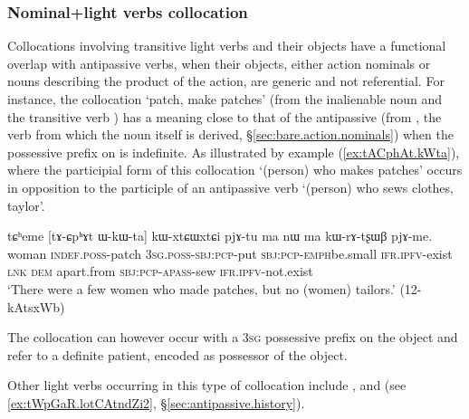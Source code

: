 \subsubsection{Nominal+light verbs collocation  } \label{sec:antipassive.vs.light.verbs}
Collocations involving transitive light verbs and their objects have a functional overlap with antipassive verbs, when their objects, either action nominals or nouns describing the product of the action, are generic and not referential. For instance, the collocation  `patch, make patches' (from the inalienable noun  and the transitive verb ) has a meaning close to that of the antipassive  (from , the verb from which the noun  itself is derived, §\ref{sec:bare.action.nominals}) when the possessive prefix on   is indefinite. As illustrated by example (\ref{ex:tACphAt.kWta}), where the participial form of this collocation  `(person) who makes patches' occurs in opposition to the participle of an antipassive verb  `(person) who sews clothes, taylor'.  

\begin{exe}
\ex \label{ex:tACphAt.kWta}
\gll tɕʰeme [tɤ-ɕpʰɤt ɯ-kɯ-ta] kɯ-xtɕɯ\redp{}xtɕi pjɤ-tu ma nɯ ma kɯ-rɤ-tʂɯβ pjɤ-me. \\
woman \textsc{indef}.\textsc{poss}-patch \textsc{3sg}.\textsc{poss}-\textsc{sbj}:\textsc{pcp}-put  \textsc{sbj}:\textsc{pcp}-\textsc{emph}\redp{}be.small \textsc{ifr}.\textsc{ipfv}-exist \textsc{lnk} \textsc{dem} apart.from \textsc{sbj}:\textsc{pcp}-\textsc{apass}-sew \textsc{ifr}.\textsc{ipfv}-not.exist \\
\glt `There were a few women who made patches, but no (women) tailors.' (12-kAtsxWb) 	
 \end{exe}
 
 The collocation  can however occur with a \textsc{3sg} possessive prefix on the object  and refer to a definite patient, encoded as possessor of the object. 
 
 Other light verbs occurring in this type of collocation include ,  and  (see \ref{ex:tWpGaR.lotCAtndZi2}, §\ref{sec:antipassive.history}).
 

